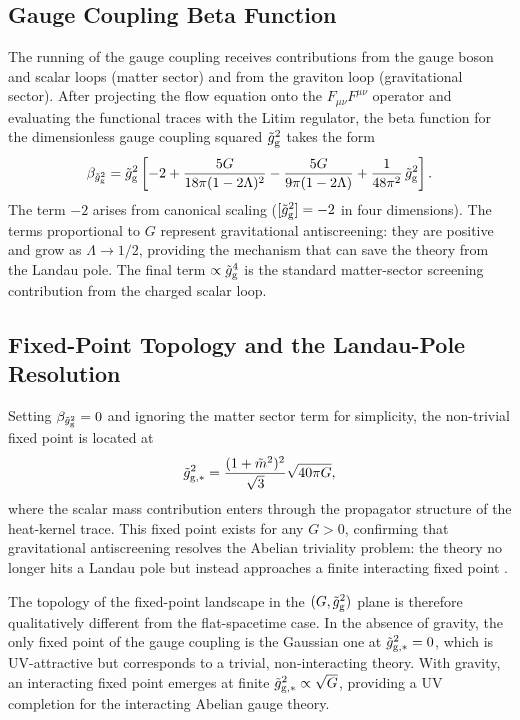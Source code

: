 \documentclass[12pt,a4paper]{article}
\begin{document}
\subsection{Gauge Coupling Beta Function}

The running of the gauge coupling receives contributions from the gauge boson
and scalar loops (matter sector) and from the graviton loop (gravitational
sector). After projecting the flow equation onto the $F_{\mu\nu}F^{\mu\nu}$
operator and evaluating the functional traces with the Litim regulator, the
beta function for the dimensionless gauge coupling squared $\tilde g_{\rm g}^2$
takes the form \cite{EichhornLinoMiqueleto2023,deBritoEichhornLino2022}
\begin{equation}
\beta_{\tilde g_{\rm g}^2}
= \tilde g_{\rm g}^2\left[
-2
+ \frac{5 G}{18\pi(1-2\Lambda)^2}
- \frac{5G}{9\pi(1-2\Lambda)}
+ \frac{1}{48\pi^2}\,\tilde g_{\rm g}^2
\right].
\label{eq:beta_gauge}
\end{equation}
The term $-2$ arises from canonical scaling ($[\tilde g_{\rm g}^2] = -2$
in four dimensions). The terms proportional to $G$ represent gravitational
antiscreening: they are positive and grow as $\Lambda \to 1/2$, providing
the mechanism that can save the theory from the Landau pole. The final term
$\propto \tilde g_{\rm g}^4$ is the standard matter-sector screening contribution
from the charged scalar loop.

\subsection{Fixed-Point Topology and the Landau-Pole Resolution}

Setting $\beta_{\tilde g_{\rm g}^2} = 0$ and ignoring the matter sector term
for simplicity, the non-trivial fixed point is located at
\begin{equation}
\tilde g_{\rm g,*}^2
= \frac{(1+\tilde m^2)^2}{\sqrt{3}}\sqrt{40\pi G},
\end{equation}
where the scalar mass contribution enters through the propagator structure of
the heat-kernel trace. This fixed point exists for any $G > 0$, confirming
that gravitational antiscreening resolves the Abelian triviality problem: the
theory no longer hits a Landau pole but instead approaches a finite interacting
fixed point \cite{deBritoEichhornLino2022,EichhornLinoMiqueleto2023}.

The topology of the fixed-point landscape in the $(G, \tilde g_{\rm g}^2)$ plane
is therefore qualitatively different from the flat-spacetime case. In the
absence of gravity, the only fixed point of the gauge coupling is the Gaussian
one at $\tilde g_{\rm g,*}^2 = 0$, which is UV-attractive but corresponds to a
trivial, non-interacting theory. With gravity, an interacting fixed point
emerges at finite $\tilde g_{\rm g,*}^2 \propto \sqrt{G}$, providing a UV
completion for the interacting Abelian gauge theory.
\end{document}
